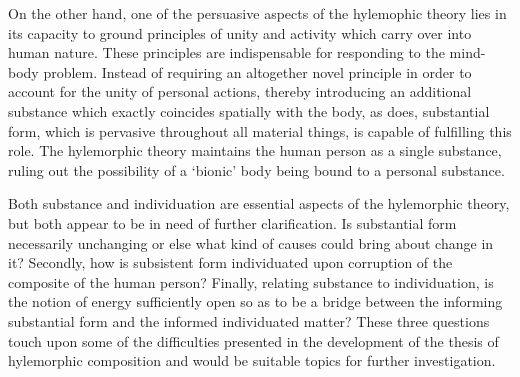 On the other hand, one of the persuasive aspects of the hylemophic theory lies in its capacity to ground principles of unity and activity which carry over into human nature. These principles are indispensable for responding to the mind-body problem. Instead of requiring an altogether novel principle in order to account for the unity of personal actions, thereby introducing an additional substance which exactly coincides spatially with the body, as \textcite[][9]{Lowe2006-LOWNSD} does, substantial form, which is pervasive throughout all material things, is capable of fulfilling this role. The hylemorphic theory maintains the human person as a single substance, ruling out the possibility of a `bionic' body being bound to a personal substance. \parencite[][9]{Lowe2006-LOWNSD}

Both substance and individuation are essential aspects of the hylemorphic theory, but both appear to be in need of further clarification. Is substantial form necessarily unchanging or else what kind of causes could bring about change in it? Secondly, how is subsistent form individuated upon corruption of the composite of the human person? Finally, relating substance to individuation, is the notion of energy sufficiently open so as to be a bridge between the informing substantial form and the informed individuated matter? These three questions touch upon some of the difficulties presented in the development of the thesis of hylemorphic composition and would be suitable topics for further investigation.
